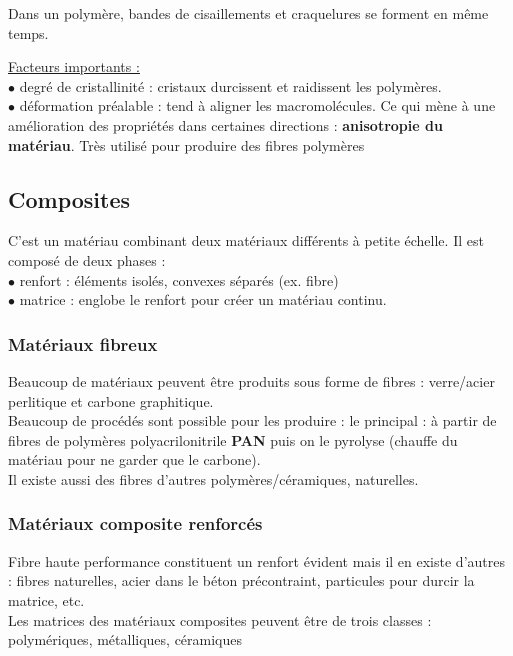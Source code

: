 \documentclass[../main.tex]{subfiles}
\begin{document}
Dans un polymère, bandes de cisaillements et craquelures se forment en même temps. 

\quad \underline{Facteurs importants :} \\
$\bullet$ degré de cristallinité : cristaux durcissent et raidissent les polymères. \\
$\bullet$ déformation préalable : tend à aligner les macromolécules. Ce qui mène à une amélioration des propriétés dans certaines directions : \textbf{anisotropie du matériau}. Très utilisé pour produire des fibres polymères\\

\subsection{Composites}

C'est un matériau combinant deux matériaux différents à petite échelle. Il est composé de deux phases :\\
$\bullet$ renfort : éléments isolés, convexes séparés (ex. fibre)\\
$\bullet$ matrice : englobe le renfort pour créer un matériau continu.\\

\subsubsection{Matériaux fibreux}
Beaucoup de matériaux peuvent être produits sous forme de fibres : verre/acier perlitique et carbone graphitique. \\
Beaucoup de procédés sont possible pour les produire : le principal : à partir de fibres de polymères polyacrilonitrile \textbf{PAN} puis on le pyrolyse (chauffe du matériau pour ne garder que le carbone). \\

Il existe aussi des fibres d'autres polymères/céramiques, naturelles.\\

\subsubsection{Matériaux composite renforcés}
Fibre haute performance constituent un renfort évident mais il en existe d'autres : fibres naturelles, acier dans le béton précontraint, particules pour durcir la matrice, etc.\\

Les matrices des matériaux composites peuvent être de trois classes :\\
polymériques, métalliques, céramiques\\
\end{document}
